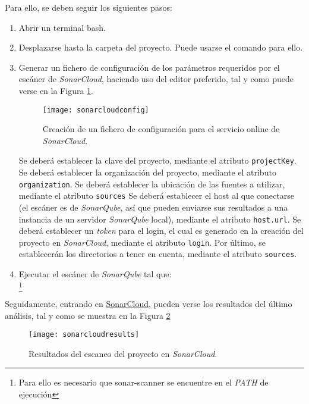 Para ello, se deben seguir los siguientes pasos: 
\begin{enumerate}
\item Abrir un terminal bash.
\item Desplazarse hasta la carpeta del proyecto. Puede usarse el comando  para ello.
\item Generar un fichero de configuración de los parámetros requeridos por el escáner de \emph{SonarCloud}, haciendo uso del editor preferido, tal y como puede verse en la Figura \ref{fig:sonarcloudconfig}.
\begin{figure}
	\centering
	\texttt{[image: sonarcloudconfig]}
	\caption[Configuración de SonarCloud]{Creación de un fichero de configuración para el servicio online de \emph{SonarCloud}.}\label{fig:sonarcloudconfig}
\end{figure}

Se deberá establecer la clave del proyecto, mediante el atributo \texttt{projectKey}.
Se deberá establecer la organización del proyecto, mediante el atributo \texttt{organization}.
Se deberá establecer la ubicación de las fuentes a utilizar, mediante el atributo \texttt{sources}
Se deberá establecer el host al que conectarse (el escáner es de \emph{SonarQube}, así que pueden enviarse sus resultados a una instancia de un servidor \emph{SonarQube} local), mediante el atributo \texttt{host.url}.
Se deberá establecer un \emph{token} para el login, el cual es generado en la creación del proyecto en \emph{SonarCloud}, mediante el atributo \texttt{login}.
Por último, se establecerán los directorios a tener en cuenta, mediante el atributo \texttt{sources}.

\item Ejecutar el escáner de \emph{SonarQube} tal que:\\ \footnote{Para ello es necesario que sonar-scanner se encuentre en el \emph{PATH} de ejecución}
\end{enumerate}

Seguidamente, entrando en \href{https://sonarcloud.io/dashboard?id=GII_0_17.02_SNSI}{SonarCloud}, pueden verse los resultados del último análisis, tal y como se muestra en la Figura \ref{fig:sonarcloudresults}
\begin{figure}
	\centering
	\texttt{[image: sonarcloudresults]}
	\caption[Resultados de SonarCloud]{Resultados del escaneo del proyecto en \emph{SonarCloud}.}\label{fig:sonarcloudresults}
\end{figure}


